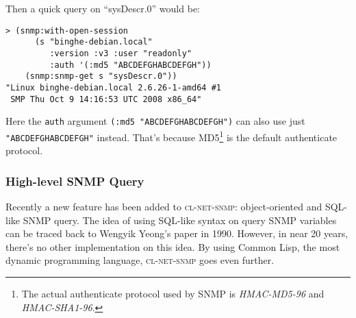 \documentclass[reprint,natbib,9pt]{sigplanconf}
\begin{document}
Then a quick query on ``sysDescr.0'' would be:
\begin{verbatim}
> (snmp:with-open-session
      (s "binghe-debian.local"
         :version :v3 :user "readonly"
         :auth '(:md5 "ABCDEFGHABCDEFGH"))
    (snmp:snmp-get s "sysDescr.0"))
"Linux binghe-debian.local 2.6.26-1-amd64 #1
 SMP Thu Oct 9 14:16:53 UTC 2008 x86_64"
\end{verbatim}

Here the \texttt{auth} argument \texttt{(:md5 "ABCDEFGHABCDEFGH")} can
also use just \texttt{"ABCDEFGHABCDEFGH"} instead. That's because
MD5\footnote{The actual authenticate protocol used by SNMP is
  \textsl{HMAC-MD5-96} and \textsl{HMAC-SHA1-96}.} is the default
authenticate protocol.

\subsubsection{High-level SNMP Query}

Recently a new feature has been added to \textsc{cl-net-snmp}: object-oriented
and SQL-like SNMP query. The idea of using SQL-like syntax on query SNMP
variables can be traced back to Wengyik Yeong's paper \cite{SNMPql} in 1990.
However, in near 20 years, there's no other implementation on this idea.
By using Common Lisp, the most dynamic programming language, \textsc{cl-net-snmp}
goes even further.
\end{document}
